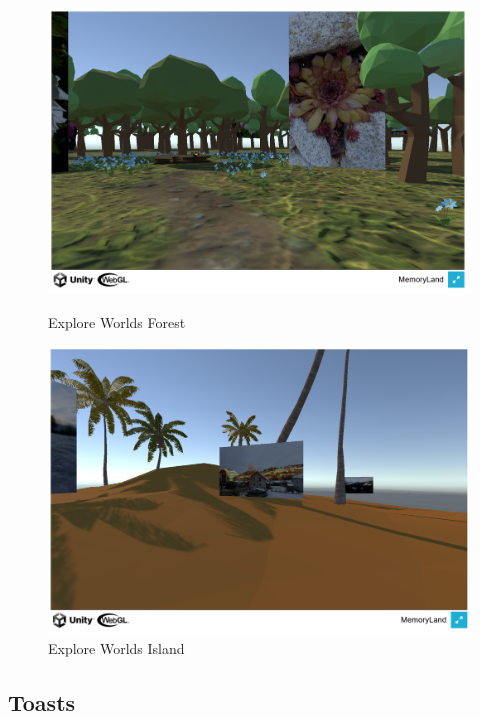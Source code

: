 \begin{figure} [h t]
    \centering
    \includegraphics[scale=0.5]{pics/explore_worlds_forest.PNG}
    \caption{Explore Worlds Forest}
    \label{fig:explore-worlds-forest}

    
    \centering
    \includegraphics[scale=0.5]{pics/explore_worlds_island.PNG}
    \caption{Explore Worlds Island}
    \label{fig:explore-worlds-island}
\end{figure}
















\subsection{Toasts}

